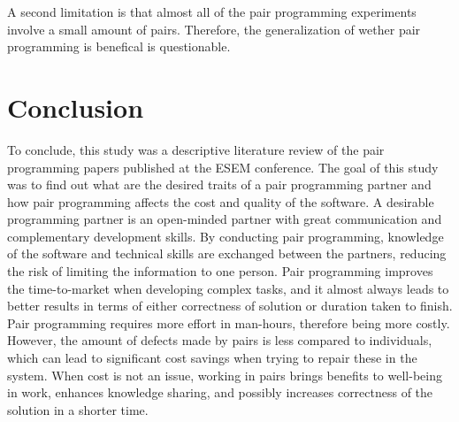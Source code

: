 \documentclass[conference]{IEEEtran}
\begin{document}
A second limitation is that almost all of the pair programming experiments involve a small amount of pairs. Therefore, the generalization of wether pair programming is benefical is questionable.

\section{Conclusion}

To conclude, this study was a descriptive literature review of the pair programming papers published at the ESEM conference. The goal of this study was to find out what are the desired traits of a pair programming partner and how pair programming affects the cost and quality of the software. A desirable programming partner is an open-minded partner with great communication and complementary development skills. By conducting pair programming, knowledge of the software and technical skills are exchanged between the partners, reducing the risk of limiting the information to one person. Pair programming improves the time-to-market when developing complex tasks, and it almost always leads to better results in terms of either correctness of solution or duration taken to finish. Pair programming requires more effort in man-hours, therefore being more costly. However, the amount of defects made by pairs is less compared to individuals, which can lead to significant cost savings when trying to repair these in the system. When cost is not an issue, working in pairs brings benefits to well-being in work, enhances knowledge sharing, and possibly increases correctness of the solution in a shorter time.






\end{document}
